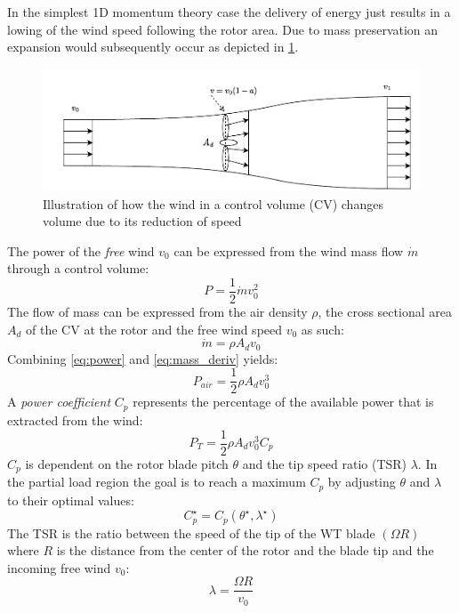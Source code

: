 In the simplest 1D momentum theory case the delivery of energy just results in a lowing of the wind speed following the rotor area. Due to mass preservation an expansion would subsequently occur as depicted in \cref{fig:betz}.
\begin{figure}[ht]
	\centering
	\includegraphics[width=0.8\linewidth]{Graphics/FlowThroughRotor.pdf}
	\caption{Illustration of how the wind in a control volume (CV) changes volume due to its reduction of speed}
	\label{fig:betz}
\end{figure}
The power of the \textit{free} wind $ v_0 $ can be expressed from the wind mass flow $ \dot{m} $ through a control volume:
\begin{equation} \label{eq:power}
	P = \dfrac{1}{2} \dot{m} v_0^2
\end{equation}
The flow of mass can be expressed from the air density $ \rho $, the cross sectional area $ A_d $ of the CV  at the rotor and the free wind speed $ v_0 $ as such:
\begin{equation}\label{eq:mass_deriv}
	\dot{m} = \rho A_d v_0
\end{equation}
Combining \cref{eq:power} and \cref{eq:mass_deriv} yields:
\begin{equation}\label{eq:power2}
	P_{air} = \dfrac{1}{2} \rho A_d v_0^3
\end{equation}
A \textit{power coefficient} $ C_p $ represents the percentage of the available power that is extracted from the wind:
\begin{equation}\label{eq:power_w_Cp}
	P_{T} = \dfrac{1}{2} \rho A_d v_0^3 C_p
\end{equation}
$ C_p $ is dependent on the rotor blade pitch $ \theta $ and the tip speed ratio (TSR) $ \lambda $. In the partial load region the goal is to reach a maximum $ C_p $ by adjusting $ \theta $ and  $ \lambda $ to their optimal values:
\begin{equation}\label{eq:cp_optimal}
	C_p^\star = C_p(\theta^\star, \lambda^\star)
\end{equation}
The TSR is the ratio between the speed of the tip of the WT blade $ (\Omega R) $ where $ R $ is the distance from the center of the rotor and the blade tip and the incoming free wind $v_0$:
\begin{equation}\label{eq:tipspeedratio}
	\lambda = \dfrac{\Omega R}{v_0}
\end{equation}

